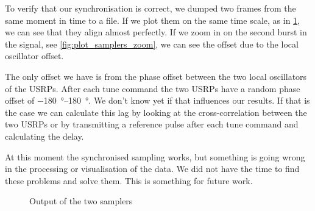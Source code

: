 \documentclass[a4paper, openany, oneside]{memoir}
\begin{document}
To verify that our synchronisation is correct, we dumped two frames from the same moment in time to a file. If we plot them on the same time scale, as in \cref{fig:plot_samplers}, we can see that they align almost perfectly. If we zoom in on the second burst in the signal, see \cref{fig:plot_samplers_zoom}, we can see the offset due to the local oscillator offset.

The only offset we have is from the phase offset between the two local oscillators of the USRPs. After each tune command the two USRPs have a random phase offset of \SIrange[retain-explicit-plus]{-180}{+180}{\degree}.  We don't know yet if that influences our results. If that is the case we can calculate this lag by looking at the cross-correlation between the two USRPs or by transmitting a reference pulse after each tune command and calculating the delay.

At this moment the synchronised sampling works, but something is going wrong in the processing or visualisation of the data. We did not have the time to find these problems and solve them. This is something for future work.

\begin{figure}[H]
\centering
{}
\caption{Output of the two samplers}
\label{fig:plot_samplers}
\end{figure}
\end{document}

